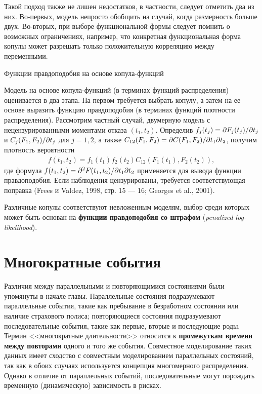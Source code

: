 Такой подход также не лишен недостатков, в частности, следует отметить два из них. Во-первых, модель непросто обобщить на случай, когда размерность больше двух. Во-вторых, при выборе функциональной формы следует помнить о возможных ограничениях, например, что конкретная функциональная форма копулы может разрешать только положительную корреляцию между переменными.


        \begin{center}Функции правдоподобия на основе копула-функций\end{center}
        \noindent
Модель на основе копула-функций (в терминах функций распределения) оценивается в два этапа. На первом требуется выбрать копулу, а затем на ее основе выразить функцию правдоподобия (в терминах функций плотности распределения). Рассмотрим частный случай, двумерную модель с нецензурированными моментами отказа $(t_1, t_2)$. Определив $f_j(t_j) = \partial F_j(t_j) / \partial t_j$ и $C_j(F_1, F_2) / \partial t_j$ для $j = 1, 2$, а также $C_{12}(F_1, F_2) = \partial C(F_1, F_2) / \partial t_1 \partial t_2$, получим плотность вероятности
    \begin{align}\label{eq:19.23}
    f(t_1,t_2) = f_1(t_1) f_2(t_2) C_{12} (F_1(t_1), F_2(t_2)),
    \end{align}
где формула $f(t_1, t_2) = \partial^2 F(t_1, t_2) / \partial t_1 \partial t_2$ применяется для вывода функции правдоподобия. Если наблюдения цензурированы, требуется соответствующая поправка (Frees и Valdez, 1998, стр. 15 --- 16; Georges et al., 2001). 

Различные копулы соответствуют невложенным моделям, %
выбор среди которых может быть основан на \textbf{функции правдоподобия со штрафом} (\textit{penalized log-likelihood}). %

\section{Многократные события}\label{sec:19.4}

\noindent
Различия между параллельными и повторяющимися состояниями были упомянуты в начале главы. Параллельные состояния подразумевают параллельные события, такие как пребывание в безработном состоянии или наличие страхового полиса; повторяющиеся состояния подразумевают последовательные события, такие как первые, вторые и последующие роды. Термин <<многократные длительности>> относится к \textbf{промежуткам времени между повторами} одного и того же события. Совместное моделирование таких данных имеет сходство с совместным моделированием параллельных состояний, так как в обоих случаях используется концепция многомерного распределения. Однако в отличие от параллельных событий, последовательные могут порождать временную (динамическую) зависимость в рисках.

